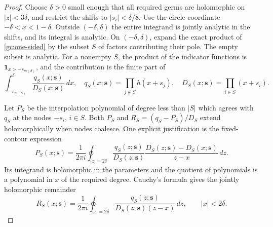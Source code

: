 \begin{proof}
Choose $\delta>0$ small enough that all required germs are holomorphic on
$|z|<3\delta$, and restrict the shifts to $|s_i|<\delta/8$.  Use the circle
coordinate $-\delta<x<1-\delta$.  Outside $(-\delta,\delta)$ the entire
integrand is jointly analytic in the shifts, and its integral is analytic.
On $(-\delta,\delta)$, expand the exact product of
\eqref{gc:one-sided} by the subset $S$ of factors contributing their pole.
The empty subset is analytic.  For a nonempty $S$, the product of the
indicator functions is $\boldsymbol{1}_{x>-s_{m(S)}}$, and the contribution
is the finite part of
\begin{equation}\label{gc:subset-integral}
 \int_{-s_{m(S)}}^\delta \frac{q_S(x;\boldsymbol{s})}
                                      {D_S(x;\boldsymbol{s})}\,dx,
 \quad
 q_S(x;\boldsymbol{s})=\prod_{j\notin S}h(x+s_j),
 \quad D_S(x;\boldsymbol{s})=\prod_{i\in S}(x+s_i).
\end{equation}

Let $P_S$ be the interpolation polynomial of degree less than $|S|$ which
agrees with $q_S$ at the nodes $-s_i$, $i\in S$.  Both $P_S$ and
$R_S=(q_S-P_S)/D_S$ extend holomorphically when nodes coalesce.  One
explicit justification is the fixed-contour expression
\begin{equation}\label{gc:hermite}
 P_S(x;\boldsymbol{s})=\frac1{2\pi i}\oint_{|z|=2\delta}
 \frac{q_S(z;\boldsymbol{s})}{D_S(z;\boldsymbol{s})}
 \frac{D_S(z;\boldsymbol{s})-D_S(x;\boldsymbol{s})}{z-x}\,dz.
\end{equation}
Its integrand is holomorphic in the parameters and the quotient of
polynomials is a polynomial in $x$ of the required degree.  Cauchy's
formula gives the jointly holomorphic remainder
\[
 R_S(x;\boldsymbol{s})=\frac1{2\pi i}\oint_{|z|=2\delta}
 \frac{q_S(z;\boldsymbol{s})}
 {D_S(z;\boldsymbol{s})(z-x)}\,dz,
 \qquad |x|<2\delta.
\]


\end{proof}

